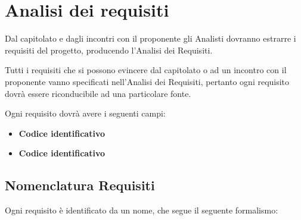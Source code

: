 \section{Analisi dei requisiti}

Dal capitolato e dagli incontri con il proponente gli Analisti dovranno estrarre i requisiti del progetto, producendo l'Analisi dei Requisiti.

Tutti i requisiti che si possono evincere dal capitolato o ad un incontro con il proponente vanno specificati nell'Analisi dei Requisiti, pertanto ogni requisito dovrà essere riconducibile ad una particolare fonte.

Ogni requisito dovrà avere i seguenti campi:
\begin{itemize}
 \item \textbf{Codice identificativo}
 \item \textbf{Codice identificativo}
\end{itemize}

\subsection{Nomenclatura Requisiti}

Ogni requisito è identificato da un nome, che segue il seguente formalismo:
\begin{center}
\end{center}

